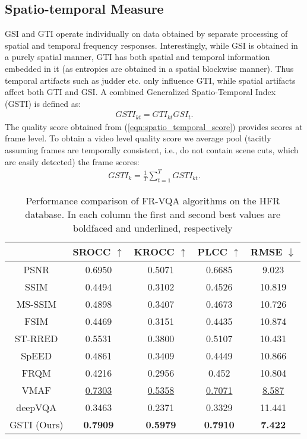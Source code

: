 \documentclass[journal]{IEEEtran}
\begin{document}
\vspace{-7pt}
\subsection{Spatio-temporal Measure}
GSI and GTI operate individually on data obtained by separate processing of spatial and temporal frequency responses. Interestingly, while GSI is obtained in a purely spatial manner, GTI has both spatial and temporal information embedded in it (as entropies are obtained in a spatial blockwise manner). Thus temporal artifacts such as judder etc. only influence GTI, while spatial artifacts affect both GTI and GSI. A combined Generalized Spatio-Temporal Index (GSTI) is defined as:
\begin{align}
    GSTI_{kt} = GTI_{kt} GSI_t.
    \label{eqn:spatio_temporal_score}
\end{align}
The quality score obtained from (\ref{eqn:spatio_temporal_score}) provides scores at frame level. To obtain a video level quality score we average pool (tacitly assuming frames are temporally consistent, i.e., do not contain scene cuts, which are easily detected) the frame scores:
\begin{align}
    GSTI_k = \frac{1}{T} \sum_{t = 1} ^T GSTI_{kt}.
    \label{eqn:GSTI}
\end{align}

\begin{table}[t]
\caption{Performance comparison of FR-VQA algorithms on the HFR database. In each column the first and second best values are boldfaced and underlined, respectively}
    \label{Table:MOS_comparison}
    \centering
    \begin{tabular}{|c||c|c|c|c|}
        \hline
        ~    & SROCC $\uparrow$ & KROCC $\uparrow$ & PLCC $\uparrow$ & RMSE $\downarrow$ \\ \hline \hline
        PSNR & 0.6950 & 0.5071 & 0.6685 & 9.023 \\ 
		SSIM \cite{wang2004image} & 0.4494 & 0.3102 & 0.4526 & 10.819 \\ 
		MS-SSIM \cite{wang2003multiscale} & 0.4898 & 0.3407 & 0.4673 & 10.726 \\ 
		FSIM \cite{zhang2011fsim} & 0.4469 & 0.3151 & 0.4435 & 10.874 \\ 
		ST-RRED \cite{soundararajan2012video} & 0.5531 & 0.3800 & 0.5107 & 10.431 \\ 
		SpEED \cite{bampis2017speed} & 0.4861 & 0.3409 & 0.4449 & 10.866 \\ 
		FRQM \cite{zhang2017frame} & 0.4216 & 0.2956 & 0.452 & 10.804 \\ 
		VMAF \cite{VMAF2016}& \underline{0.7303} & \underline{0.5358} & \underline{0.7071} & \underline{8.587} \\
		deepVQA \cite{kim2018deep} & 0.3463 & 0.2371 & 0.3329 & 11.441 \\
        GSTI (Ours) & \textbf{0.7909} & \textbf{0.5979} & \textbf{0.7910} & \textbf{7.422} \\
        \hline
    \end{tabular}
\end{table}
\end{document}
